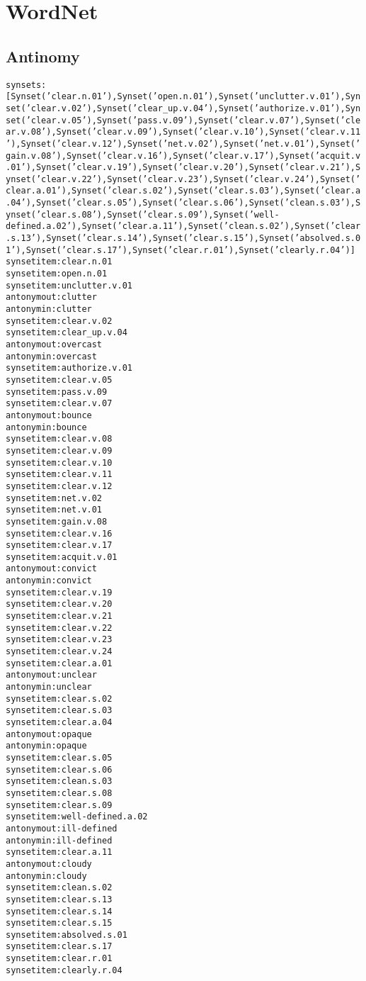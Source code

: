 \section{WordNet}

\subsection{Antinomy}

\begin{alltt}
synsets:
[Synset('clear.n.01'), Synset('open.n.01'), Synset('unclutter.v.01'), Synset('clear.v.02'), Synset('clear_up.v.04'), Synset('authorize.v.01'), Synset('clear.v.05'), Synset('pass.v.09'), Synset('clear.v.07'), Synset('clear.v.08'), Synset('clear.v.09'), Synset('clear.v.10'), Synset('clear.v.11'), Synset('clear.v.12'), Synset('net.v.02'), Synset('net.v.01'), Synset('gain.v.08'), Synset('clear.v.16'), Synset('clear.v.17'), Synset('acquit.v.01'), Synset('clear.v.19'), Synset('clear.v.20'), Synset('clear.v.21'), Synset('clear.v.22'), Synset('clear.v.23'), Synset('clear.v.24'), Synset('clear.a.01'), Synset('clear.s.02'), Synset('clear.s.03'), Synset('clear.a.04'), Synset('clear.s.05'), Synset('clear.s.06'), Synset('clean.s.03'), Synset('clear.s.08'), Synset('clear.s.09'), Synset('well-defined.a.02'), Synset('clear.a.11'), Synset('clean.s.02'), Synset('clear.s.13'), Synset('clear.s.14'), Synset('clear.s.15'), Synset('absolved.s.01'), Synset('clear.s.17'), Synset('clear.r.01'), Synset('clearly.r.04')]% chktex 36
synset item:clear.n.01
synset item:open.n.01
synset item:unclutter.v.01
antonym out:clutter
antonym in:clutter
synset item:clear.v.02
synset item:clear_up.v.04
antonym out:overcast
antonym in:overcast
synset item:authorize.v.01
synset item:clear.v.05
synset item:pass.v.09
synset item:clear.v.07
antonym out:bounce
antonym in:bounce
synset item:clear.v.08
synset item:clear.v.09
synset item:clear.v.10
synset item:clear.v.11
synset item:clear.v.12
synset item:net.v.02
synset item:net.v.01
synset item:gain.v.08
synset item:clear.v.16
synset item:clear.v.17
synset item:acquit.v.01
antonym out:convict
antonym in:convict
synset item:clear.v.19
synset item:clear.v.20
synset item:clear.v.21
synset item:clear.v.22
synset item:clear.v.23
synset item:clear.v.24
synset item:clear.a.01
antonym out:unclear
antonym in:unclear
synset item:clear.s.02
synset item:clear.s.03
synset item:clear.a.04
antonym out:opaque
antonym in:opaque
synset item:clear.s.05
synset item:clear.s.06
synset item:clean.s.03
synset item:clear.s.08
synset item:clear.s.09
synset item:well-defined.a.02
antonym out:ill-defined
antonym in:ill-defined
synset item:clear.a.11
antonym out:cloudy
antonym in:cloudy
synset item:clean.s.02
synset item:clear.s.13
synset item:clear.s.14
synset item:clear.s.15
synset item:absolved.s.01
synset item:clear.s.17
synset item:clear.r.01
synset item:clearly.r.04
\end{alltt}

